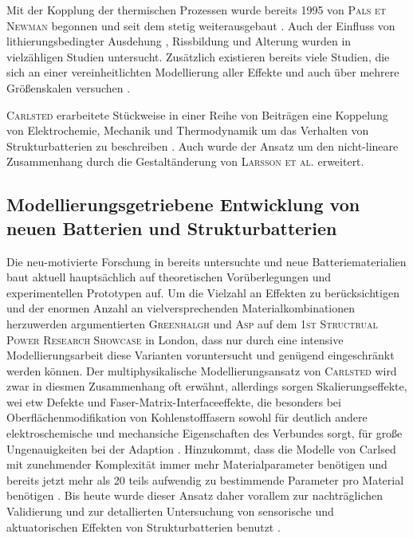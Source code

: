 Mit der Kopplung der thermischen Prozessen wurde bereits 1995 von \textsc{Pals et Newman} \cite{Pals1995,Pals1995a} begonnen und seit dem stetig weiterausgebaut \cite{Chen2005,Onda2006,Kim2013,Gao2021,Liu2023}. Auch der Einfluss von lithierungsbedingter Ausdehung 
\cite{Bower2011,Yang2014,Roberts2014,Pereira2019,Mai2019,Li2020,Hoeschele2023}, Rissbildung \cite{Dionisi2017,Wang2020a,Pistorio2023} und Alterung \cite{RedondoIglesias2020} wurden in vielzähligen Studien untersucht. Zusätzlich existieren bereits viele Studien, die sich an einer vereinheitlichten Modellierung aller Effekte \cite{Wu2014,Kim2018,Liu2020,Yin2020} und auch über mehrere Größenskalen versuchen \cite{Liu2019,Li2020a,Katrasnik2021}.

\textsc{Carlsted} erarbeitete Stückweise in einer Reihe von Beiträgen eine Koppelung von Elektrochemie, Mechanik und Thermodynamik um das Verhalten von Strukturbatterien zu beschreiben \cite{Carlstedt2019,Carlstedt2019a,Carlstedt2019b,Carlstedt2020,Carlstedt2020b, Carlstedt2022,Carlstedt2022a,Carlstedt2022b}. Auch wurde der Ansatz um den nicht-lineare Zusammenhang durch die Gestaltänderung von \textsc{Larsson et al.} \cite{Larsson2023} erweitert. 

\subsection{Modellierungsgetriebene Entwicklung von neuen Batterien und Strukturbatterien}

Die neu-motivierte Forschung in bereits untersuchte und neue Batteriematerialien baut aktuell hauptsächlich auf theoretischen Vorüberlegungen und experimentellen Prototypen auf. Um die Vielzahl an Effekten zu berücksichtigen und der enormen Anzahl an vielversprechenden Materialkombinationen herzuwerden argumentierten \textsc{Greenhalgh} \cite{Greenhalgh2024,Greenhalgh2024a} und \textsc{Asp} \cite{Asp2024} auf dem \textsc{1st Structrual Power Research Showcase} in London, dass nur durch eine intensive Modellierungsarbeit diese Varianten voruntersucht und genügend eingeschränkt werden können.
Der multiphysikalische Modellierungsansatz von \textsc{Carlsted} wird zwar in diesmen Zusammenhang oft erwähnt, allerdings sorgen Skalierungseffekte, wei etw Defekte und Faser-Matrix-Interfaceeffekte, die besonders bei Oberflächenmodifikation von Kohlenstofffasern sowohl für deutlich andere elektroschemische und mechansiche Eigenschaften des Verbundes sorgt, für große Ungenauigkeiten bei der Adaption \cite{Franco2019,Fam2024}. Hinzukommt, dass die Modelle von Carlsed mit zunehmender Komplexität immer mehr Materialparameter benötigen und bereits jetzt mehr als 20 teils aufwendig zu bestimmende Parameter pro Material benötigen \cite{Greenhalgh2024a}. Bis heute wurde dieser Ansatz daher vorallem zur nachträglichen Validierung und zur detallierten Untersuchung von sensorische und aktuatorischen Effekten von Strukturbatterien benutzt \cite{Carlstedt2023}.

